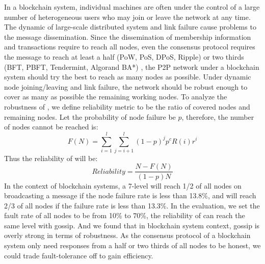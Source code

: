 In a blockchain system, individual machines are often under the control of a large number of heterogeneous users who may join or leave the network at any time. The dynamic of large-scale distributed system and link failure cause problems to the message dissemination. Since the dissemination of membership information and transactions require to reach all nodes, even the consensus protocol requires the message to reach at least a half (PoW, PoS, DPoS, Ripple) or two thirds (BFT, PBFT, Tendermint, Algorand BA*) \cite{zheng2016blockchain}, the P2P network under a blockchain system should try the best to reach as many nodes as possible. Under dynamic node joining/leaving and link failure, the network should be robust enough to cover as many as possible the remaining working nodes.
To analyze the robustness of \xxx, we define reliability metric to be the ratio of covered nodes and remaining nodes. Let the probability of node failure be $p$, therefore, the number of nodes cannot be reached is: $$F(N)=\sum_{i=1}^{l} \sum_{j=i+1}^{l}(1-p)^jp^cR(i)r^{i}$$
Thus the reliability of \xxx will be: $$Reliability = \frac{N-F(N)}{(1-p)N}$$
In the context of blockchain systems, a 7-level \xxx will reach 1/2 of all nodes on broadcasting a message if the node failure rate is less than 13.8\%, and will reach 2/3 of all nodes if the failure rate is less than 13.3\%. In the evaluation, we set the fault rate of all nodes to be from 10\% to 70\%, the reliability of \xxx can reach the same level with gossip. And we found that in blockchain system context, gossip is overly strong in terms of robustness. As the consensus protocol of a blockchain system only need responses from a half or two thirds of all nodes to be honest, we could trade fault-tolerance off to gain efficiency.